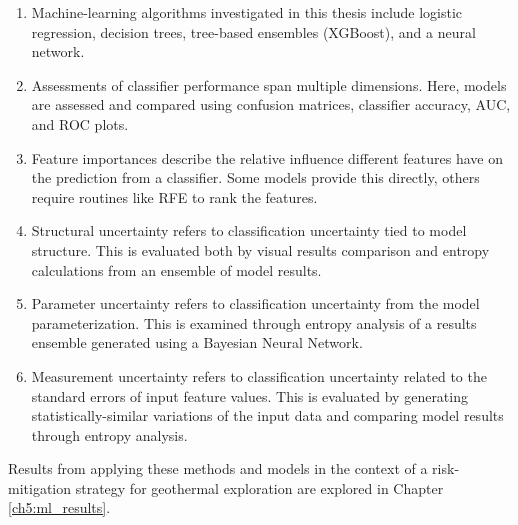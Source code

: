 \begin{enumerate}
    \item Machine-learning algorithms investigated in this thesis include logistic regression, decision trees, tree-based ensembles (XGBoost), and a neural network.
    \item Assessments of classifier performance span multiple dimensions. Here, models are assessed and compared using confusion matrices, classifier accuracy, AUC, and ROC plots.
    \item Feature importances describe the relative influence different features have on the prediction from a classifier. Some models provide this directly, others require routines like RFE to rank the features.
    \item Structural uncertainty refers to classification uncertainty tied to model structure. This is evaluated both by visual results comparison and entropy calculations from an ensemble of model results.
    \item Parameter uncertainty refers to classification uncertainty from the model parameterization. This is examined through entropy analysis of a results ensemble generated using a Bayesian Neural Network.
    \item Measurement uncertainty refers to classification uncertainty related to the standard errors of input feature values. This is evaluated by generating statistically-similar variations of the input data and comparing model results through entropy analysis. 
\end{enumerate}

Results from applying these methods and models in the context of a risk-mitigation strategy for geothermal exploration are explored in Chapter \ref{ch5:ml_results}.